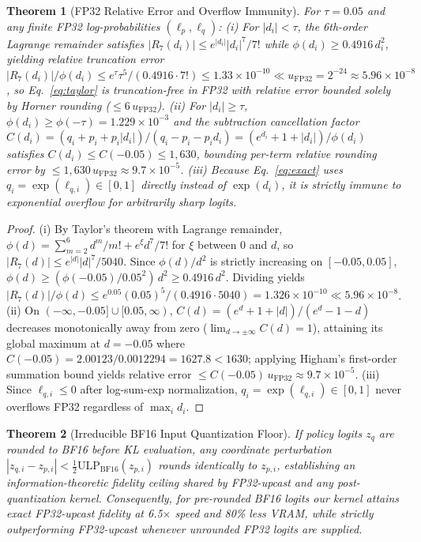 \documentclass[10pt,twocolumn]{article}
\newtheorem{theorem}{Theorem}
\begin{document}
\begin{theorem}[FP32 Relative Error and Overflow Immunity]
For $\tau = 0.05$ and any finite FP32 log-probabilities $(\ell_p, \ell_q)$:
(i) For $|d_i| < \tau$, the 6th-order Lagrange remainder satisfies $|R_7(d_i)| \le e^{|d_i|} |d_i|^7 / 7!$ while $\phi(d_i) \ge 0.4916\,d_i^2$, yielding relative truncation error $|R_7(d_i)|/\phi(d_i) \le e^\tau \tau^5 / (0.4916 \cdot 7!) \le 1.33\times 10^{-10} \ll u_{\mathrm{FP32}} = 2^{-24} \approx 5.96\times 10^{-8}$, so Eq.~\eqref{eq:taylor} is truncation-free in FP32 with relative error bounded solely by Horner rounding ($\le 6\,u_{\mathrm{FP32}}$).
(ii) For $|d_i| \ge \tau$, $\phi(d_i) \ge \phi(-\tau) = 1.229\times 10^{-3}$ and the subtraction cancellation factor $C(d_i) = (q_i + p_i + p_i |d_i|)/(q_i - p_i - p_i d_i) = (e^{d_i} + 1 + |d_i|)/\phi(d_i)$ satisfies $C(d_i) \le C(-0.05) \le 1{,}630$, bounding per-term relative rounding error by $\le 1{,}630\,u_{\mathrm{FP32}} \approx 9.7\times 10^{-5}$.
(iii) Because Eq.~\eqref{eq:exact} uses $q_i = \exp(\ell_{q,i}) \in [0,1]$ directly instead of $\exp(d_i)$, it is strictly immune to exponential overflow for arbitrarily sharp logits.
\end{theorem}
\begin{proof}
(i) By Taylor's theorem with Lagrange remainder, $\phi(d) = \sum_{m=2}^6 d^m/m! + e^\xi d^7/7!$ for $\xi$ between $0$ and $d$, so $|R_7(d)| \le e^{|d|}|d|^7/5040$. Since $\phi(d)/d^2$ is strictly increasing on $[-0.05, 0.05]$, $\phi(d) \ge (\phi(-0.05)/0.05^2)\,d^2 \ge 0.4916\,d^2$. Dividing yields $|R_7(d)|/\phi(d) \le e^{0.05}(0.05)^5 / (0.4916\cdot 5040) = 1.326\times 10^{-10} \ll 5.96\times 10^{-8}$.
(ii) On $(-\infty, -0.05] \cup [0.05, \infty)$, $C(d) = (e^d + 1 + |d|)/(e^d - 1 - d)$ decreases monotonically away from zero ($\lim_{d\to\pm\infty} C(d) = 1$), attaining its global maximum at $d=-0.05$ where $C(-0.05) = 2.00123 / 0.0012294 = 1627.8 < 1630$; applying Higham's first-order summation bound \citep{higham2002accuracy} yields relative error $\le C(-0.05)\,u_{\mathrm{FP32}} \approx 9.7\times 10^{-5}$.
(iii) Since $\ell_{q,i} \le 0$ after log-sum-exp normalization, $q_i = \exp(\ell_{q,i}) \in [0,1]$ never overflows FP32 regardless of $\max_i d_i$.
\end{proof}

\begin{theorem}[Irreducible BF16 Input Quantization Floor]
If policy logits $z_q$ are rounded to BF16 before KL evaluation, any coordinate perturbation $|z_{q,i} - z_{p,i}| < \frac{1}{2}\mathrm{ULP}_{\mathrm{BF16}}(z_{p,i})$ rounds identically to $z_{p,i}$, establishing an information-theoretic fidelity ceiling shared by FP32-upcast and any post-quantization kernel. Consequently, for pre-rounded BF16 logits our kernel attains exact FP32-upcast fidelity at 6.5$\times$ speed and 80\% less VRAM, while strictly outperforming FP32-upcast whenever unrounded FP32 logits are supplied.
\end{theorem}
\end{document}
